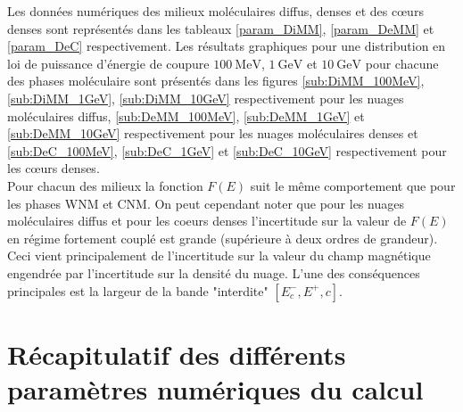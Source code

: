 \documentclass[10pt,a4paper]{article}
\begin{document}
Les données numériques des milieux moléculaires diffus, denses et des cœurs denses sont représentés dans les tableaux \ref{param_DiMM}, \ref{param_DeMM} et \ref{param_DeC} respectivement. Les résultats graphiques pour une distribution en loi de puissance d'énergie de coupure $100~\mathrm{MeV}$, $1~\mathrm{GeV}$ et $10~\mathrm{GeV}$ pour chacune des phases moléculaire sont présentés dans les figures \ref{sub:DiMM_100MeV}, \ref{sub:DiMM_1GeV}, \ref{sub:DiMM_10GeV} respectivement pour les nuages moléculaires diffus, \ref{sub:DeMM_100MeV}, \ref{sub:DeMM_1GeV} et \ref{sub:DeMM_10GeV} respectivement pour les nuages moléculaires denses et \ref{sub:DeC_100MeV}, \ref{sub:DeC_1GeV} et \ref{sub:DeC_10GeV} respectivement pour les cœurs denses. \\ 

Pour chacun des milieux la fonction $F(E)$ suit le même comportement que pour les phases WNM et CNM. On peut cependant noter que pour les nuages moléculaires diffus et pour les coeurs denses l'incertitude sur la valeur de $F(E)$ en régime fortement couplé est grande (supérieure à deux ordres de grandeur). Ceci vient principalement de l'incertitude sur la valeur du champ magnétique engendrée par l'incertitude sur la densité du nuage. L'une des conséquences principales est la largeur de la bande "interdite" $[E^-_c, E^+,c]$. 


\appendix

\section{Récapitulatif des différents paramètres numériques du calcul}
\end{document}
